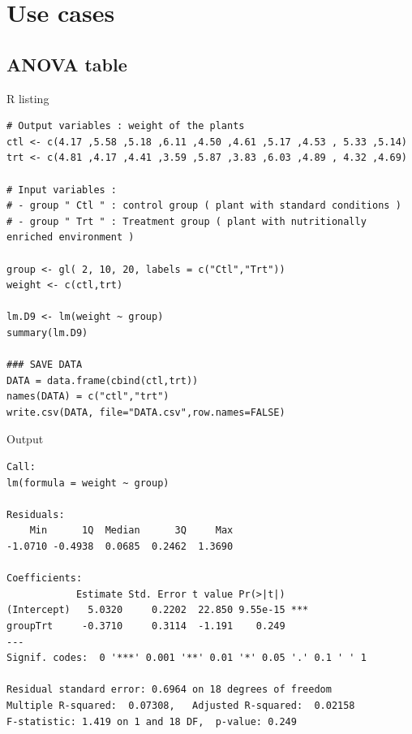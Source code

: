 %

\section{Use cases}

\subsection{ANOVA table}

R listing
\begin{lstlisting}[style=RStyle]
# Output variables : weight of the plants
ctl <- c(4.17 ,5.58 ,5.18 ,6.11 ,4.50 ,4.61 ,5.17 ,4.53 , 5.33 ,5.14)
trt <- c(4.81 ,4.17 ,4.41 ,3.59 ,5.87 ,3.83 ,6.03 ,4.89 , 4.32 ,4.69)

# Input variables :
# - group " Ctl " : control group ( plant with standard conditions )
# - group " Trt " : Treatment group ( plant with nutritionally enriched environment )

group <- gl( 2, 10, 20, labels = c("Ctl","Trt"))
weight <- c(ctl,trt)

lm.D9 <- lm(weight ~ group)
summary(lm.D9)

### SAVE DATA
DATA = data.frame(cbind(ctl,trt))
names(DATA) = c("ctl","trt")
write.csv(DATA, file="DATA.csv",row.names=FALSE)
\end{lstlisting}

Output
\begin{lstlisting}[style=output]
Call:
lm(formula = weight ~ group)

Residuals:
    Min      1Q  Median      3Q     Max
-1.0710 -0.4938  0.0685  0.2462  1.3690

Coefficients:
            Estimate Std. Error t value Pr(>|t|)
(Intercept)   5.0320     0.2202  22.850 9.55e-15 ***
groupTrt     -0.3710     0.3114  -1.191    0.249
---
Signif. codes:  0 '***' 0.001 '**' 0.01 '*' 0.05 '.' 0.1 ' ' 1

Residual standard error: 0.6964 on 18 degrees of freedom
Multiple R-squared:  0.07308,   Adjusted R-squared:  0.02158
F-statistic: 1.419 on 1 and 18 DF,  p-value: 0.249
\end{lstlisting}

